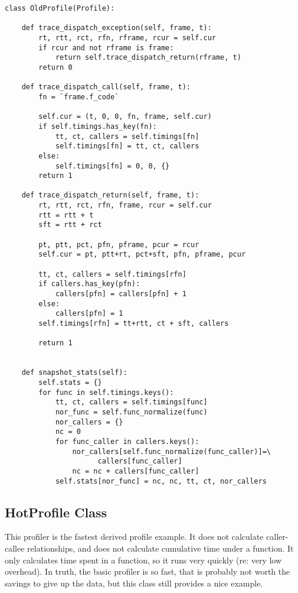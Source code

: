 \begin{verbatim}
class OldProfile(Profile):

    def trace_dispatch_exception(self, frame, t):
        rt, rtt, rct, rfn, rframe, rcur = self.cur
        if rcur and not rframe is frame:
            return self.trace_dispatch_return(rframe, t)
        return 0

    def trace_dispatch_call(self, frame, t):
        fn = `frame.f_code`
        
        self.cur = (t, 0, 0, fn, frame, self.cur)
        if self.timings.has_key(fn):
            tt, ct, callers = self.timings[fn]
            self.timings[fn] = tt, ct, callers
        else:
            self.timings[fn] = 0, 0, {}
        return 1

    def trace_dispatch_return(self, frame, t):
        rt, rtt, rct, rfn, frame, rcur = self.cur
        rtt = rtt + t
        sft = rtt + rct

        pt, ptt, pct, pfn, pframe, pcur = rcur
        self.cur = pt, ptt+rt, pct+sft, pfn, pframe, pcur

        tt, ct, callers = self.timings[rfn]
        if callers.has_key(pfn):
            callers[pfn] = callers[pfn] + 1
        else:
            callers[pfn] = 1
        self.timings[rfn] = tt+rtt, ct + sft, callers

        return 1


    def snapshot_stats(self):
        self.stats = {}
        for func in self.timings.keys():
            tt, ct, callers = self.timings[func]
            nor_func = self.func_normalize(func)
            nor_callers = {}
            nc = 0
            for func_caller in callers.keys():
                nor_callers[self.func_normalize(func_caller)]=\
                      callers[func_caller]
                nc = nc + callers[func_caller]
            self.stats[nor_func] = nc, nc, tt, ct, nor_callers
\end{verbatim}
        

\subsection{HotProfile Class}

This profiler is the fastest derived profile example.  It does not
calculate caller-callee relationships, and does not calculate
cumulative time under a function.  It only calculates time spent in a
function, so it runs very quickly (re: very low overhead).  In truth,
the basic profiler is so fast, that is probably not worth the savings
to give up the data, but this class still provides a nice example.

